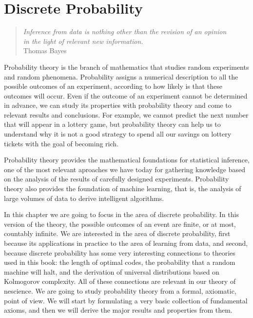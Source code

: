 %
%


\chapter{Discrete Probability}
\label{chap:Probability Theory}

\begin{quote}
\begin{flushright}
\emph{Inference from data is nothing other than the revision of an opinion\\
in the light of relevant new information.}\\
Thomas Bayes
\end{flushright}
\end{quote}
\bigskip

Probability theory is the branch of mathematics that studies random experiments and random phenomena. Probability assigns a numerical description to all the possible outcomes of an experiment, according to how likely is that these outcomes will occur. Even if the outcome of an experiment cannot be determined in advance, we can study its properties with probability theory and come to relevant results and conclusions. For example, we cannot predict the next number that will appear in a lottery game, but probability theory can help us to understand why it is not a good strategy to spend all our savings on lottery tickets with the goal of becoming rich.

Probability theory provides the mathematical foundations for statistical inference, one of the most relevant aproaches we have today for gathering knowledge based on the analysis of the results of carefully designed experiments. Probability theory also provides the foundation of machine learning, that is, the analysis of large volumes of data to derive intelligent algorithms.

In this chapter we are going to focus in the area of discrete probability. In this version of the theory, the possible outcomes of an event are finite, or at most, countably infinite. We are interested in the area of discrete probability, first because its applications in practice to the area of learning from data, and second, because discrete probability has some very interesting connections to theories used in this book: the length of optimal codes, the probability that a random machine will halt, and the derivation of universal distributions based on Kolmogorov complexity. All of these connections are relevant in our theory of nescience. We are going to study probability theory from a formal, axiomatic, point of view. We will start by formulating a very basic collection of fundamental axioms, and then we will derive the major results and properties from them. 

